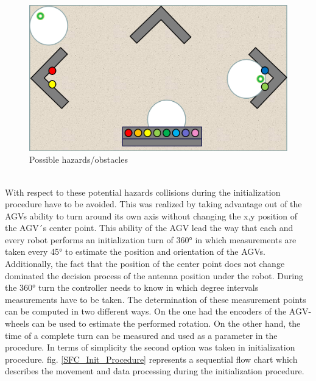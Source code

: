 \begin{figure}[!htbp]
\centering
\includegraphics[width = 16cm]{Pictures/hazards}
\caption{Possible hazards/obstacles}
\label{hazards}
\end{figure}\\
With respect to these potential hazards collisions during the initialization procedure have to be avoided. This was realized by taking advantage out of the AGVs ability to turn around its own axis without changing the x,y position of the AGV´s center point. This ability of the AGV lead the way that each and every robot performs an initialization turn of 360° in which measurements are taken every 45° to estimate the position and orientation of the AGVs. Additionally, the fact that the position of the center point does not change dominated the decision process of the antenna position under the robot. 
During the 360° turn the controller needs to know in which degree intervals measurements have to be taken. The determination of these measurement points can be computed in two different ways. On the one had the encoders of the AGV-wheels can be used to estimate the performed rotation. On the other hand, the time of a complete turn can be measured and used as a parameter in the procedure. In terms of simplicity the second option was taken in initialization procedure.  
fig. \ref{SFC_Init_Procedure} represents a sequential flow chart which describes the movement and data processing during the initialization procedure.\\ 
